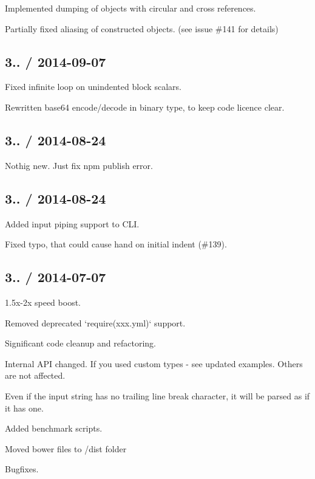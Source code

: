 \begin{DoxyItemize}
\item Implemented dumping of objects with circular and cross references.
\item Partially fixed aliasing of constructed objects. (see issue \#141 for details)
\end{DoxyItemize}

\subsection*{3.. / 2014-\/09-\/07 }


\begin{DoxyItemize}
\item Fixed infinite loop on unindented block scalars.
\item Rewritten base64 encode/decode in binary type, to keep code licence clear.
\end{DoxyItemize}

\subsection*{3.. / 2014-\/08-\/24 }


\begin{DoxyItemize}
\item Nothig new. Just fix npm publish error.
\end{DoxyItemize}

\subsection*{3.. / 2014-\/08-\/24 }


\begin{DoxyItemize}
\item Added input piping support to C\+L\+I.
\item Fixed typo, that could cause hand on initial indent (\#139).
\end{DoxyItemize}

\subsection*{3.. / 2014-\/07-\/07 }


\begin{DoxyItemize}
\item 1.\+5x-\/2x speed boost.
\item Removed deprecated `require(\textquotesingle{}xxx.\+yml\textquotesingle{})` support.
\item Significant code cleanup and refactoring.
\item Internal A\+P\+I changed. If you used custom types -\/ see updated examples. Others are not affected.
\item Even if the input string has no trailing line break character, it will be parsed as if it has one.
\item Added benchmark scripts.
\item Moved bower files to /dist folder
\item Bugfixes.
\end{DoxyItemize}

